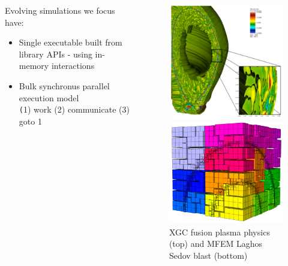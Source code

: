 \documentclass[aspectratio=169]{beamer}
\begin{document}
\begin{frame}
\begin{columns}
\begin{column}{0.7\textwidth}
      Evolving simulations we focus have:
      \begin{itemize}
        \item Single executable built from library APIs - using in-memory
          interactions
        \item Bulk synchronus parallel execution model\\
          {\small \texttt (1) work (2) communicate (3) goto 1}
      \end{itemize}
    \end{column}
    \begin{column}{0.3\textwidth}
      \begin{figure}
        \centering
        \includegraphics[width=.75\textwidth]{figures/xgcCase.png} \\
        \includegraphics[width=.75\textwidth]{figures/laghos_sedov.png}\\
        \tiny{XGC fusion plasma physics (top) and MFEM Laghos Sedov blast
        (bottom)}
      \end{figure}
    \end{column}
  \end{columns}
\end{frame}
\end{document}
